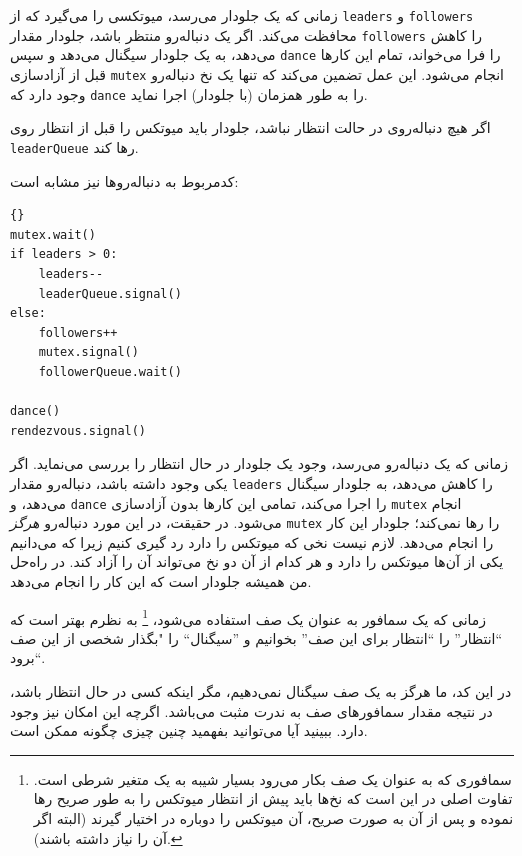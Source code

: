 \documentclass{book}
\begin{document}
    زمانی که یک جلو‌دار می‌رسد، میوتکسی را می‌گیرد که از \texttt{leaders} و \texttt{followers} محافظت می‌کند.
    اگر یک دنباله‌رو منتظر باشد، جلو‌دار مقدار {\tt followers} را کاهش می‌دهد،  به یک جلو‌دار سیگنال می‌دهد و سپس {\tt dance} را فرا می‌خواند، 
    تمام این‌ کارها  قبل از آزادسازی \texttt{mutex} انجام می‌شود. 
    این عمل تضمین می‌کند که تنها یک نخ دنباله‌رو وجود دارد که \texttt{dance} را به طور همزمان (با جلودار) اجرا نماید. 
    
    اگر هیچ دنباله‌روی در حالت انتظار نباشد، جلو‌دار باید میوتکس را قبل از انتظار روی \texttt{leaderQueue} رها کند. 

    کدمربوط به دنباله‌روها نیز مشابه است:

\begin{latin}
\begin{lstlisting}[title=\rl{راه حل صف (دنباله‌روها)}]{}
mutex.wait()
if leaders > 0:
    leaders--
    leaderQueue.signal()
else:
    followers++
    mutex.signal()
    followerQueue.wait()    

dance()
rendezvous.signal()
\end{lstlisting}
\end{latin}
    زمانی که یک دنباله‌رو می‌رسد، وجود یک جلودار در حال انتظار را بررسی می‌نماید. 
    اگر یکی وجود داشته باشد، دنباله‌رو مقدار {\tt leaders} را کاهش می‌دهد، به جلودار سیگنال می‌دهد، و {\tt dance} را اجرا می‌کند، 
    تمامی این‌ کارها بدون آزادسازی \texttt{mutex} انجام می‌شود. 
    در حقیقت، در این مورد دنباله‌رو {\em هرگز} {\tt mutex} را رها نمی‌کند؛‌ جلودار این کار را انجام می‌دهد. 
    لازم نیست نخی که میوتکس را دارد رد گیری کنیم زیرا که می‌دانیم یکی از آن‌ها میوتکس را دارد و هر کدام از آن دو نخ می‌تواند آن را آزاد کند. 
    در راه‌حل من همیشه جلودار است که این کار را انجام می‌دهد. 
    
    زمانی که یک سمافور به عنوان یک صف استفاده می‌شود،%
\footnote{
    سمافوری که به عنوان یک صف بکار می‌رود بسیار شیبه به یک متغیر شرطی است. تفاوت اصلی در این است که نخ‌ها باید پیش از انتظار میوتکس را به طور صریح
     رها نموده و پس از آن به صورت صریح، آن میوتکس را دوباره در اختیار گیرند (البته اگر آن را نیاز داشته باشند). }
    به نظرم بهتر است که ``انتظار'' را ``انتظار برای این صف'' بخوانیم و ''سیگنال`` را  "بگذار شخصی از این صف برود``.
    
    در این کد، ما هرگز به یک صف سیگنال نمی‌دهیم، مگر اینکه کسی در حال انتظار باشد، 
    در نتیجه مقدار سمافور‌های صف به ندرت مثبت می‌باشد. اگرچه این امکان نیز وجود دارد. 
    ببینید آیا می‌توانید بفهمید چنین چیزی چگونه ممکن است.
\end{document}
